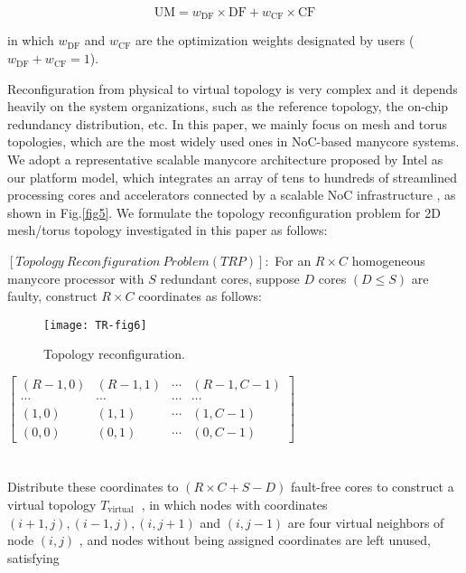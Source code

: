  \begin{equation}
     \mathrm{UM}=w_{\mathrm{DF}} \times \mathrm{DF}+w_{\mathrm{CF}} \times \mathrm{CF}
             \label{eq4}
 \end{equation}

 in which $w_{\mathrm{DF}}$ and   $w_{\mathrm{CF}} $    are the optimization weights designated by users ($w_{\mathrm{DF}} + w_{\mathrm{CF}} =1$).

Reconfiguration from physical to virtual topology is very complex and it depends heavily on the system organizations, such as the reference topology, the on-chip redundancy distribution, etc. In this paper, we mainly focus on mesh and torus topologies, which are the most widely used ones in NoC-based manycore systems. We adopt a representative scalable manycore architecture proposed by Intel as our platform model, which integrates an array of tens to hundreds of streamlined processing cores and accelerators connected by a scalable NoC infrastructure \cite{computingfew}, as shown in Fig.\ref{fig5}. We formulate the topology reconfiguration problem for 2D mesh/torus topology investigated in this paper as follows:

$[Topology\ Reconfiguration\ Problem (TRP)]:$ For an $R \times C$ homogeneous manycore processor with $S$ redundant cores, suppose $D$ cores $(D \leq S)$   are faulty, construct $R \times C$ coordinates as follows:\\

 \begin{figure}[t]
     \centering
         \texttt{[image: TR-fig6]}
           \caption{Topology reconfiguration.            }
              \label{fig6}
 \end{figure}

 $\left[\begin{array}{cccc}(R-1,0) & (R-1,1) & \cdots & (R-1, C-1) \\ \cdots & \cdots & \cdots & \cdots \\ (1,0) & (1,1) & \cdots & (1, C-1) \\ (0,0) & (0,1) & \cdots & (0, C-1)\end{array}\right]$ \\
     \\
     \\ Distribute these coordinates to $(R \times C+S-D)$  fault-free cores to construct a virtual topology $T_{\text {virtual }}$ , in which nodes with coordinates $(i+1, j),(i-1, j),(i, j+1)$  and  $(i, j-1)$ are four virtual neighbors of node $(i, j)$ , and nodes without being assigned coordinates are left unused, satisfying \\

